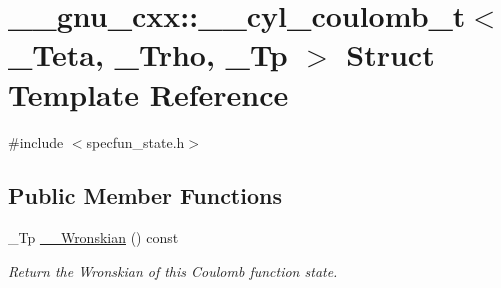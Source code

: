 \hypertarget{struct____gnu__cxx_1_1____cyl__coulomb__t}{}\section{\+\_\+\+\_\+gnu\+\_\+cxx\+:\+:\+\_\+\+\_\+cyl\+\_\+coulomb\+\_\+t$<$ \+\_\+\+Teta, \+\_\+\+Trho, \+\_\+\+Tp $>$ Struct Template Reference}
\label{struct____gnu__cxx_1_1____cyl__coulomb__t}


{\ttfamily \#include $<$specfun\+\_\+state.\+h$>$}

\subsection*{Public Member Functions}
\begin{DoxyCompactItemize}
\item 
\+\_\+\+Tp \hyperlink{struct____gnu__cxx_1_1____cyl__coulomb__t_a7ce3df5dd80026df89e43b37c9efe36f}{\+\_\+\+\_\+\+Wronskian} () const
\begin{DoxyCompactList}\small\item\em Return the Wronskian of this Coulomb function state. \end{DoxyCompactList}\end{DoxyCompactItemize}
